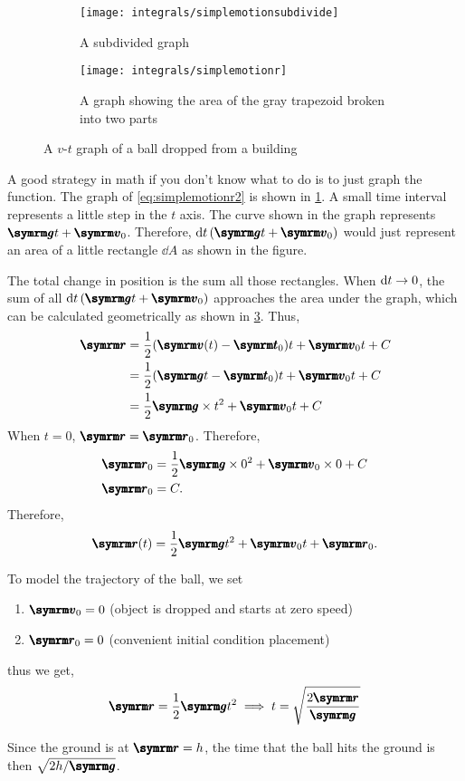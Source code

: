 \begin{figure}[ht]
    \centering
    \begin{subfigure}[b]{0.45\textwidth}
        \centering
        \texttt{[image: integrals/simplemotionsubdivide]}
        \caption{A subdivided graph}
        \label{fig:simplemotionsubdivided}
    \end{subfigure}
    \begin{subfigure}[b]{0.45\textwidth}
        \centering
        \texttt{[image: integrals/simplemotionr]}
        \caption{A graph showing the area of the gray trapezoid broken into two parts}
        \label{fig:simplemotionr}
    \end{subfigure}
    \caption{A $v$-$t$ graph of a ball dropped from a building}
\end{figure}

\begin{multicols}{2}
A good strategy in math if you don't know what to do is to just graph the function. The graph of \cref{eq:simplemotionr2} is shown in \cref{fig:simplemotionsubdivided}. A small time interval represents a little step in the $t$ axis. The curve shown in the graph represents $\vv{g}t + \vv{v}_0$. Therefore, $\dd{t}(\vv{g}t + \vv{v}_0)$ would just represent an area of a little rectangle $\dd{A}$ as shown in the figure.

The total change in position is the sum all those rectangles. When $\dd{t} \rightarrow 0$, the sum of all $\dd{t}(\vv{g}t + \vv{v}_0)$ approaches the area under the graph, which can be calculated geometrically as shown in \cref{fig:simplemotionr}. Thus,
\begin{align}
    \vv{r} &= \frac{1}{2}(\vv{v}(t) - \vv{t}_0)t + \vv{v}_0t + C \\
    &= \frac{1}{2}(\vv{g}t - \vv{t}_0)t + \vv{v}_0t + C \\
    &= \frac{1}{2}\vv{g}\times t^2 + \vv{v}_0t + C
\end{align}
When $t = 0$, $\vv{r} = \vv{r}_0$. Therefore,
\begin{align*}
    \vv{r}_0 &= \frac{1}{2}\vv{g}\times 0^2 + \vv{v}_0\times 0 + C \\
    \vv{r}_0 &= C.
\end{align*}
Therefore,
\begin{equation}
    \vv{r}(t) = \frac{1}{2}\vv{g}t^2 + \vv{v}_0t + \vv{r}_0.
\end{equation}

To model the trajectory of the ball, we set
\begin{enumerate}[noitemsep]
    \item $\vv{v}_0 = 0$ (object is dropped and starts at zero speed)
    \item $\vv{r}_0 = 0$ (convenient initial condition placement)
\end{enumerate}
thus we get,
\begin{gather}
    \vv{r} = \frac{1}{2}\vv{g}t^2 \implies t = \sqrt{\frac{2\vv{r}}{\vv{g}}}
\end{gather}
\end{multicols}
Since the ground is at $\vv{r} = h$, the time that the ball hits the ground is then $\sqrt{2h/\vv{g}}$.

